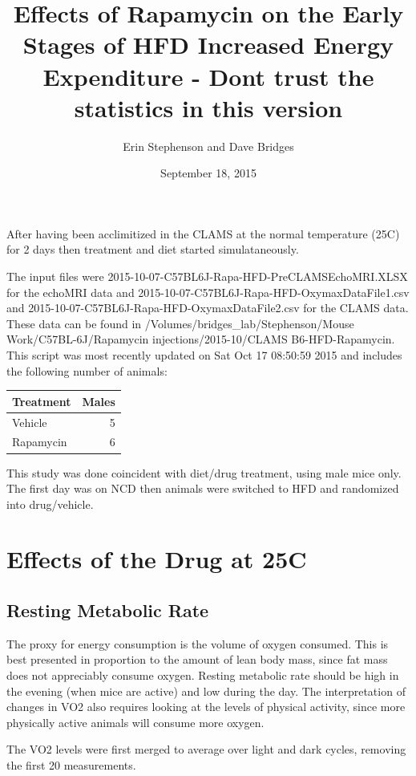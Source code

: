 \documentclass[]{article}
\title{Effects of Rapamycin on the Early Stages of HFD Increased Energy
Expenditure - Dont trust the statistics in this version}
\author{Erin Stephenson and Dave Bridges}
\date{September 18, 2015}
\begin{document}
\maketitle


After having been acclimitized in the CLAMS at the normal temperature
(25C) for 2 days then treatment and diet started simulataneously.

The input files were 2015-10-07-C57BL6J-Rapa-HFD-PreCLAMSEchoMRI.XLSX
for the echoMRI data and 2015-10-07-C57BL6J-Rapa-HFD-OxymaxDataFile1.csv
and 2015-10-07-C57BL6J-Rapa-HFD-OxymaxDataFile2.csv for the CLAMS data.
These data can be found in /Volumes/bridges\_lab/Stephenson/Mouse
Work/C57BL-6J/Rapamycin injections/2015-10/CLAMS B6-HFD-Rapamycin. This
script was most recently updated on Sat Oct 17 08:50:59 2015 and
includes the following number of animals:

\begin{longtable}[c]{@{}lr@{}}
\toprule
Treatment & Males\tabularnewline
\midrule
\endhead
Vehicle & 5\tabularnewline
Rapamycin & 6\tabularnewline
\bottomrule
\end{longtable}

This study was done coincident with diet/drug treatment, using male mice
only. The first day was on NCD then animals were switched to HFD and
randomized into drug/vehicle.

\section{Effects of the Drug at 25C}\label{effects-of-the-drug-at-25c}

\subsection{Resting Metabolic Rate}\label{resting-metabolic-rate}

The proxy for energy consumption is the volume of oxygen consumed. This
is best presented in proportion to the amount of lean body mass, since
fat mass does not appreciably consume oxygen. Resting metabolic rate
should be high in the evening (when mice are active) and low during the
day. The interpretation of changes in VO2 also requires looking at the
levels of physical activity, since more physically active animals will
consume more oxygen.

The VO2 levels were first merged to average over light and dark cycles,
removing the first 20 measurements.
\end{document}

